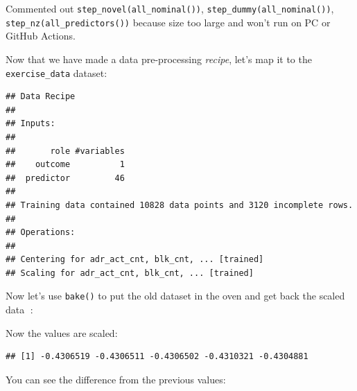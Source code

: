 \documentclass[
]{book}
\newenvironment{Shaded}{\begin{snugshade}}{\end{snugshade}}
\newcommand{\DecValTok}[1]{\textcolor[rgb]{0.00,0.00,0.81}{#1}}
\newcommand{\KeywordTok}[1]{\textcolor[rgb]{0.13,0.29,0.53}{\textbf{#1}}}
\newcommand{\NormalTok}[1]{#1}
\newcommand{\OperatorTok}[1]{\textcolor[rgb]{0.81,0.36,0.00}{\textbf{#1}}}
\newcommand{\StringTok}[1]{\textcolor[rgb]{0.31,0.60,0.02}{#1}}
\begin{document}
Commented out \texttt{step\_novel(all\_nominal())}, \texttt{step\_dummy(all\_nominal())}, \texttt{step\_nz(all\_predictors())} because size too large and won't run on PC or GitHub Actions.

Now that we have made a data pre-processing \emph{recipe}, let's map it to the \texttt{exercise\_data} dataset:

\begin{Shaded}
\end{Shaded}

\begin{verbatim}
## Data Recipe
## 
## Inputs:
## 
##       role #variables
##    outcome          1
##  predictor         46
## 
## Training data contained 10828 data points and 3120 incomplete rows. 
## 
## Operations:
## 
## Centering for adr_act_cnt, blk_cnt, ... [trained]
## Scaling for adr_act_cnt, blk_cnt, ... [trained]
\end{verbatim}

Now let's use \texttt{bake()} to put the old dataset in the oven and get back the scaled data 🍰:

\begin{Shaded}
\end{Shaded}

Now the values are scaled:

\begin{Shaded}
\end{Shaded}

\begin{verbatim}
## [1] -0.4306519 -0.4306511 -0.4306502 -0.4310321 -0.4304881
\end{verbatim}

You can see the difference from the previous values:
\end{document}
